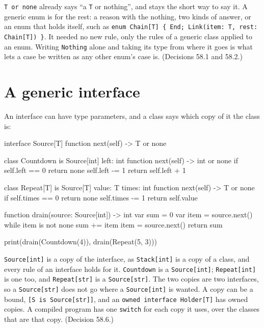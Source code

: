 \begin{why}
\verb|T or none| already says ``a \verb|T| or nothing'', and stays the
short way to say it. A generic enum is for the rest: a reason with the
nothing, two kinds of answer, or an enum that holds itself, such as
\verb|enum Chain[T] { End; Link(item: T, rest: Chain[T]) }|. It
needed no new rule, only the rules of a generic class applied to an
enum. Writing \verb|Nothing| alone and taking its type from where it
goes is what lets a case be written as any other enum's case is.
(Decisions 58.1 and 58.2.)
\end{why}

\section{A generic interface}

An interface can have type parameters, and a class says which copy of
it the class is:

\begin{zeno}[file=sources.zeno, dir=interfaces]
interface Source[T] {
    function next(self) -> T or none
}

class Countdown is Source[int] {
    left: int
    function next(self) -> int or none {
        if self.left == 0 {
            return none
        }
        self.left -= 1
        return self.left + 1
    }
}

class Repeat[T] is Source[T] {
    value: T
    times: int
    function next(self) -> T or none {
        if self.times == 0 {
            return none
        }
        self.times -= 1
        return self.value
    }
}

function drain(source: Source[int]) -> int {
    var sum = 0
    var item = source.next()
    while item is not none {
        sum += item
        item = source.next()
    }
    return sum
}

print(drain(Countdown(4)), drain(Repeat(5, 3)))
\end{zeno}

\verb|Source[int]| is a copy of the interface, as \verb|Stack[int]| is
a copy of a class, and every rule of an interface holds for it.
\verb|Countdown| is a \verb|Source[int]|; \verb|Repeat[int]| is one
too, and \verb|Repeat[str]| is a \verb|Source[str]|. The two copies
are two interfaces, so a \verb|Source[str]| does not go where a
\verb|Source[int]| is wanted. A copy can be a bound,
\verb|[S is Source[str]]|, and an \verb|owned interface Holder[T]|
has owned copies. A compiled program has one \verb|switch| for each
copy it uses, over the classes that are that copy. (Decision 58.6.)

